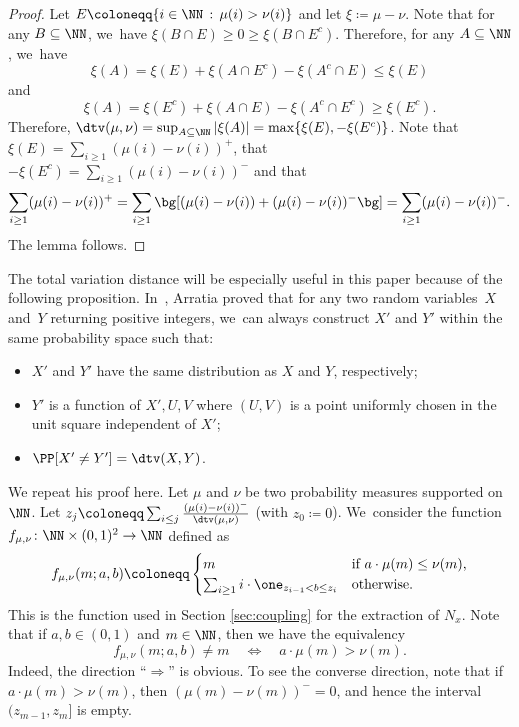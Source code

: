 \begin{proof}
Let $E \coloneqq \{i \in \NN \, : \, \mu(i) > \nu(i)\}$ and let $\xi\coloneqq \mu - \nu$. Note that for any $B\subseteq \NN$, we~have $\xi(B\cap E) \ge 0 \ge \xi(B\cap E^c)$. Therefore, for any $A \subseteq \NN$, we~have
\[
\xi(A) = \xi(E) + \xi(A \cap E^c) - \xi(A^c \cap E) \le \xi(E)
\]
and
\[
\xi(A) = \xi(E^c) + \xi(A \cap E) - \xi(A^c \cap E^c) \ge \xi(E^c).
\]
Therefore, $\dtv(\mu, \nu) = \sup_{A \subseteq \NN} |\xi(A)| = \max\{\xi(E), -\xi(E^c)\}$. Note that $\xi(E) = \sum_{i \ge 1} (\mu(i) - \nu(i))^+$, that $-\xi(E^c) = \sum_{i \ge 1} (\mu(i) - \nu(i))^-$ and that
\[
\sum_{i \ge 1} (\mu(i) - \nu(i))^+ = \sum_{i \ge 1} \bg[(\mu(i) - \nu(i)) + (\mu(i) - \nu(i))^-\bg] = \sum_{i \ge 1} (\mu(i) - \nu(i))^-.
\]
The lemma follows.
\end{proof}

The total variation distance will be especially useful in this paper because of the following proposition. In~\cite[\S 3.8]{Arratia02}, Arratia proved that for any two random variables~$X$ and~$Y$ returning positive integers, we~can always construct $X'$ and $Y'$ within the same probability space such that:
\begin{itemize}
\item $X'$ and $Y'$ have the same distribution as $X$ and $Y$, respectively;

\item $Y'$ is a function of $X', U, V$ where $(U, V)$ is a point uniformly chosen in the unit square independent of $X'$;

\item $\PP[X' \ne Y'] = \dtv(X, Y)$.
\end{itemize}
We repeat his proof here. Let $\mu$ and $\nu$ be two probability measures supported on $\NN$. Let $z_j \coloneqq \sum_{i \le j} \frac{(\mu(i) - \nu(i))^-}{\dtv(\mu, \nu)}$ (with $z_0 \coloneqq 0$). We~consider the function $f_{\mu, \nu}\colon \NN \times (0, 1)^2 \to \NN$ defined as
\[
f_{\mu, \nu}(m; a, b) \coloneqq \begin{cases}
m &\text{if $a \cdot \mu(m) \le \nu(m)$,} \\
\sum_{i \ge 1} i \cdot \one_{z_{i-1} < b \le z_i} &\text{otherwise.}
\end{cases}
\]
This is the function used in Section \ref{sec:coupling} for the extraction of $N_x$.
Note that if $a,b\in(0,1)$ and $m\in\NN$, then we have the equivalency
\begin{equation}
\label{eq:f TV property}
f_{\mu, \nu}(m; a, b) \ne m\quad\iff\quad a\cdot \mu(m) > \nu(m).
\end{equation}
Indeed, the direction ``$\Rightarrow$'' is obvious. To see the converse direction, note that if \hbox{$a\cdot\mu(m)>\nu(m)$}, then $(\mu(m)-\nu(m))^-=0$, and hence the interval $(z_{m-1},z_m]$ is empty.

